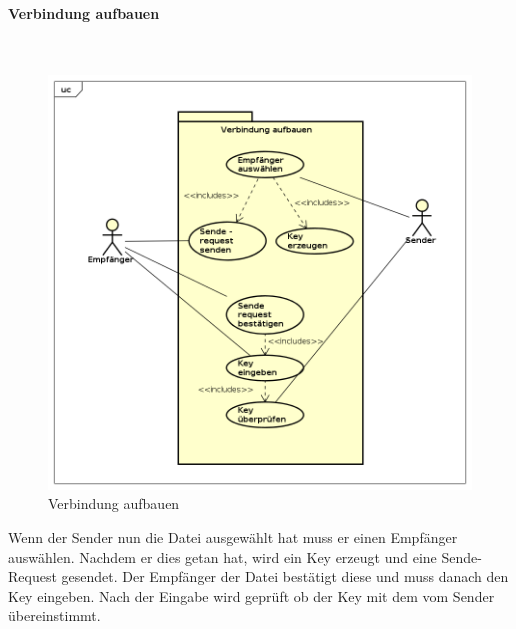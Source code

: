 \paragraph{Verbindung aufbauen}\mbox{}\\
\begin{figure}[H]
	\centering
	\includegraphics[width= 0.9\linewidth]{diagramms/useCase/verbindung_aufbauen.png}
	\caption{Verbindung aufbauen}
\end{figure}
Wenn der Sender nun die Datei ausgewählt hat muss er einen Empfänger auswählen. Nachdem er dies getan hat, wird ein Key erzeugt und eine Sende-Request gesendet. Der Empfänger der Datei bestätigt diese und muss danach den Key eingeben. Nach der Eingabe wird geprüft ob der Key mit dem vom Sender übereinstimmt.
\newpage
